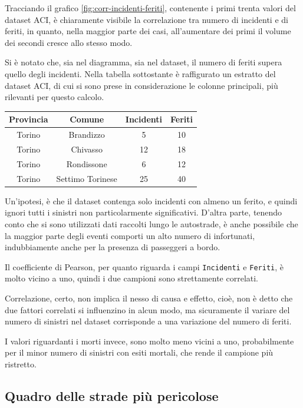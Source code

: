 \documentclass[a4paper,12pt]{report}
\newcommand{\columnstyle}[1]{\texttt{#1}}
\begin{document}
Tracciando il grafico \ref{fig:corr-incidenti-feriti}, contenente i primi trenta valori 
del dataset ACI, è chiaramente visibile la correlazione tra 
numero di incidenti e di feriti, in quanto, nella maggior parte dei casi, 
all'aumentare dei primi il volume dei secondi cresce allo stesso modo. 

Si è notato che, sia nel diagramma, sia nel dataset, il numero di feriti supera quello 
degli incidenti. 
Nella tabella sottostante è raffigurato un estratto del dataset ACI, 
di cui si sono prese in considerazione le colonne principali, più 
rilevanti per questo calcolo. 

\begin{center}
    \def\arraystretch{1.5}%
    \begin{tabular}{ |c|c|c|c| } 
    \hline
    Provincia & Comune & Incidenti & Feriti \\ 
    \hline
    \rowcolor{TableGray}
    Torino & Brandizzo & 5 & 10\\
    Torino & Chivasso & 12 & 18\\
    \rowcolor{TableGray}
    Torino & Rondissone & 6 & 12\\
    Torino & Settimo Torinese & 25 & 40\\
    \hline
    \end{tabular}
\end{center}

Un'ipotesi, è che il dataset contenga solo incidenti con almeno un ferito, 
e quindi ignori tutti i sinistri non particolarmente significativi. 
D'altra parte, tenendo conto che si sono utilizzati dati raccolti lungo 
le autostrade, è anche possibile che la maggior parte degli eventi comporti 
un alto numero di infortunati, indubbiamente anche per la presenza di passeggeri a bordo.

Il coefficiente di Pearson, per quanto riguarda i campi \columnstyle{Incidenti} 
e \columnstyle{Feriti}, 
è molto vicino a uno, quindi i due campioni sono strettamente correlati. 

Correlazione, certo, non implica il nesso di causa e effetto, 
cioè, non è detto che due fattori correlati si influenzino in alcun modo,
ma sicuramente il variare del numero di sinistri nel dataset corrisponde 
a una variazione del numero di feriti.

I valori riguardanti i morti invece, sono molto meno vicini a uno, probabilmente 
per il minor numero di sinistri con esiti mortali, che rende il campione più ristretto. 

\subsection{Quadro delle strade più pericolose}
\end{document}
